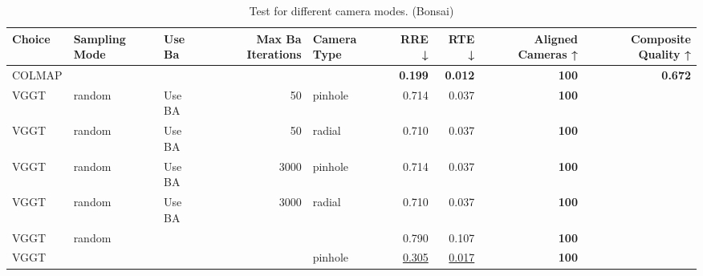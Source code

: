 \begin{table}[H]
\caption{Test for different camera modes. (Bonsai)}
\label{tab:99_camera_modes_bonsai}
\begin{tabular}{lllrlrrrr}
\toprule
Choice & Sampling Mode & Use Ba & Max Ba Iterations & Camera Type & RRE ↓ & RTE ↓ & Aligned Cameras ↑ & Composite Quality ↑ \\
\midrule
COLMAP &  &  &  &  & \textbf{0.199} & \textbf{0.012} & \textbf{100} & \textbf{0.672} \\
VGGT & random & Use BA & 50 & pinhole & 0.714 & 0.037 & \textbf{100} &  \\
VGGT & random & Use BA & 50 & radial & 0.710 & 0.037 & \textbf{100} &  \\
VGGT & random & Use BA & 3000 & pinhole & 0.714 & 0.037 & \textbf{100} &  \\
VGGT & random & Use BA & 3000 & radial & 0.710 & 0.037 & \textbf{100} &  \\
VGGT & random &  &  &  & 0.790 & 0.107 & \textbf{100} &  \\
VGGT &  &  &  & pinhole & \underline{0.305} & \underline{0.017} & \textbf{100} &  \\
\bottomrule
\end{tabular}
\end{table}
